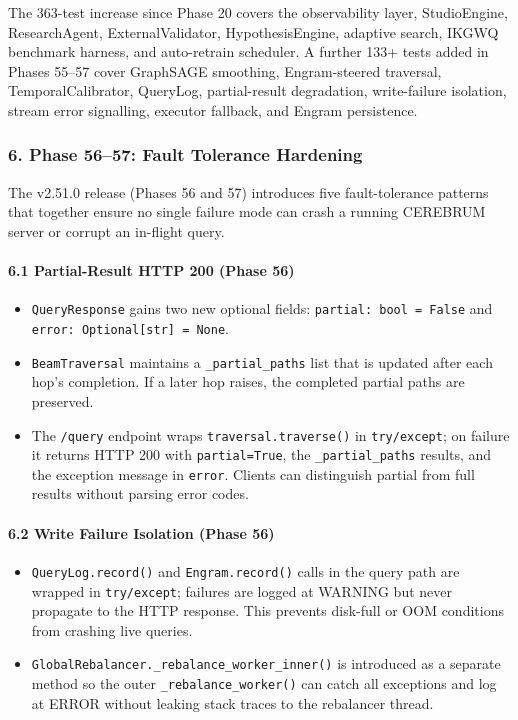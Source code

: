 The 363-test increase since Phase 20 covers the obser\-vability layer, StudioEngine, ResearchAgent, ExternalValidator, HypothesisEngine, adaptive search, IKGWQ benchmark harness, and auto-retrain scheduler. A further 133+ tests added in Phases 55–57 cover GraphSAGE smoothing, Engram-steered traversal, TemporalCalibrator, QueryLog, partial-result degradation, write-failure isolation, stream error signalling, executor fallback, and Engram persistence.

\subsubsection{6. Phase 56–57: Fault Tolerance Hardening}

The v2.51.0 release (Phases 56 and 57) introduces five fault-tolerance patterns that together ensure no single failure mode can crash a running CEREBRUM server or corrupt an in-flight query.

\paragraph{6.1 Partial-Result HTTP 200 (Phase 56)}
\begin{itemize}
\item \texttt{QueryResponse} gains two new optional fields: \texttt{partial: bool = False} and \texttt{error: Optional[str] = None}.
\item \texttt{BeamTraversal} maintains a \texttt{\_partial\_paths} list that is updated after each hop's completion. If a later hop raises, the completed partial paths are preserved.
\item The \texttt{/query} endpoint wraps \texttt{traversal.traverse()} in \texttt{try/except}; on failure it returns HTTP 200 with \texttt{partial=True}, the \texttt{\_partial\_paths} results, and the exception message in \texttt{error}. Clients can distinguish partial from full results without parsing error codes.

\end{itemize}
\paragraph{6.2 Write Failure Isolation (Phase 56)}
\begin{itemize}
\item \texttt{QueryLog.record()} and \texttt{Engram.record()} calls in the query path are wrapped in \texttt{try/except}; failures are logged at WARNING but never propagate to the HTTP response. This prevents disk-full or OOM conditions from crashing live queries.
\item \texttt{GlobalRebalancer.\_rebalance\_worker\_inner()} is introduced as a separate method so the outer \texttt{\_rebalance\_worker()} can catch all exceptions and log at ERROR without leaking stack traces to the rebalancer thread.

\end{itemize}
